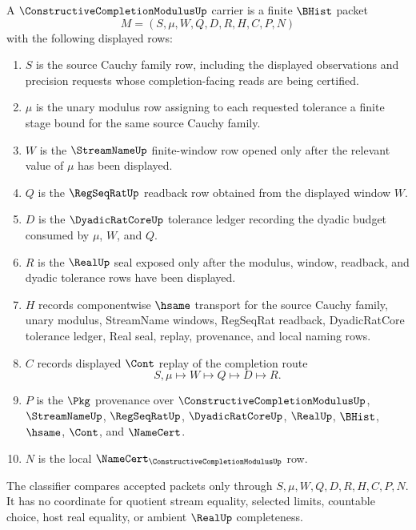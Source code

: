 \begin{definition}
\label{def:constructive-completion-modulus-carrier}
A $\ConstructiveCompletionModulusUp$ carrier is a finite $\BHist$ packet
$$
M=(S,\mu,W,Q,D,R,H,C,P,N)
$$
with the following displayed rows:
\begin{enumerate}
\item $S$ is the source Cauchy family row, including the displayed observations and precision requests whose completion-facing reads are being certified.
\item $\mu$ is the unary modulus row assigning to each requested tolerance a finite stage bound for the same source Cauchy family.
\item $W$ is the $\StreamNameUp$ finite-window row opened only after the relevant value of $\mu$ has been displayed.
\item $Q$ is the $\RegSeqRatUp$ readback row obtained from the displayed window $W$.
\item $D$ is the $\DyadicRatCoreUp$ tolerance ledger recording the dyadic budget consumed by $\mu$, $W$, and $Q$.
\item $R$ is the $\RealUp$ seal exposed only after the modulus, window, readback, and dyadic tolerance rows have been displayed.
\item $H$ records componentwise $\hsame$ transport for the source Cauchy family, unary modulus, StreamName windows, RegSeqRat readback, DyadicRatCore tolerance ledger, Real seal, replay, provenance, and local naming rows.
\item $C$ records displayed $\Cont$ replay of the completion route
$$
S,\mu\longmapsto W\longmapsto Q\longmapsto D\longmapsto R .
$$
\item $P$ is the $\Pkg$ provenance over $\ConstructiveCompletionModulusUp$, $\StreamNameUp$, $\RegSeqRatUp$, $\DyadicRatCoreUp$, $\RealUp$, $\BHist$, $\hsame$, $\Cont$, and $\NameCert$.
\item $N$ is the local $\NameCert_{\ConstructiveCompletionModulusUp}$ row.
\end{enumerate}
The classifier compares accepted packets only through $S,\mu,W,Q,D,R,H,C,P,N$. It has no coordinate for quotient stream equality, selected limits, countable choice, host real equality, or ambient $\RealUp$ completeness.
\end{definition}

